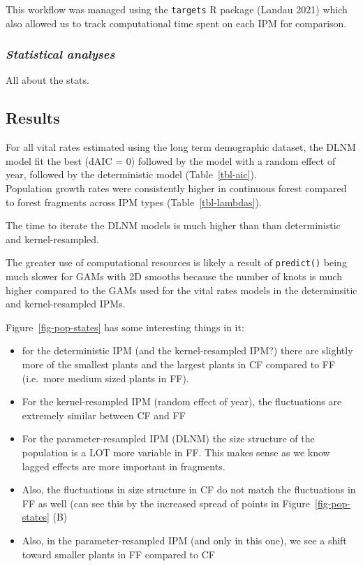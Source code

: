 \documentclass[
  12pt,
]{article}
\begin{document}
This workflow was managed using the \texttt{targets} R package (Landau
2021) which also allowed us to track computational time spent on each
IPM for comparison.

\hypertarget{statistical-analyses}{%
\subsubsection{\texorpdfstring{\emph{Statistical
analyses}}{Statistical analyses}}\label{statistical-analyses}}

All about the stats.

\hypertarget{results}{%
\subsection{Results}\label{results}}

For all vital rates estimated using the long term demographic dataset,
the DLNM model fit the best (dAIC = 0) followed by the model with a
random effect of year, followed by the deterministic model
(Table~\ref{tbl-aic}).\\

Population growth rates were consistently higher in continuous forest
compared to forest fragments across IPM types (Table~\ref{tbl-lambdas}).

The time to iterate the DLNM models is much higher than than
deterministic and kernel-resampled.

The greater use of computational resources is likely a result of
\texttt{predict()} being much slower for GAMs with 2D smooths because
the number of knots is much higher compared to the GAMs used for the
vital rates models in the determinsitic and kernel-resampled IPMs.

Figure~\ref{fig-pop-states} has some interesting things in it:

\begin{itemize}
\item
  for the deterministic IPM (and the kernel-resampled IPM?) there are
  slightly more of the smallest plants and the largest plants in CF
  compared to FF (i.e.~more medium sized plants in FF).
\item
  For the kernel-resampled IPM (random effect of year), the fluctuations
  are extremely similar between CF and FF
\item
  For the parameter-resampled IPM (DLNM) the size structure of the
  population is a LOT more variable in FF. This makes sense as we know
  lagged effects are more important in fragments.
\item
  Also, the fluctuations in size structure in CF do not match the
  fluctuations in FF as well (can see this by the increased spread of
  points in Figure~\ref{fig-pop-states} (B)
\item
  Also, in the parameter-resampled IPM (and only in this one), we see a
  shift toward smaller plants in FF compared to CF
\end{itemize}
\end{document}

